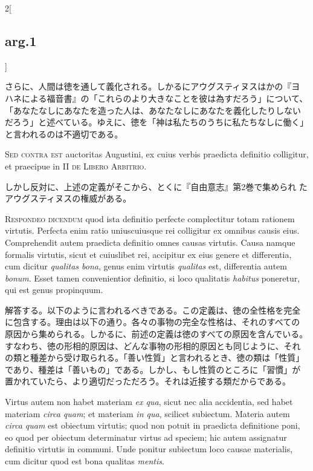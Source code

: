 \documentclass[paper=a4paper,fontsize=10pt,jafontsize=9pt,titlepage]{jlreq}
\begin{document}
\begin{paracol}{2}[\subsection{arg.1}]
\switchcolumn

さらに、人間は徳を通して義化される。しかるにアウグスティヌスはかの『ヨ
ハネによる福音書』の「これらのより大きなことを彼は為すだろう」について、
「あなたなしにあなたを造った人は、あなたなしにあなたを義化したりしない
だろう」と述べている。ゆえに、徳を「神は私たちのうちに私たちなしに働く」
と言われるのは不適切である。

\switchcolumn*[\subsection{s.c.}]

{\scshape Sed contra est} auctoritas Augustini, ex cuius verbis
praedicta definitio colligitur, et praecipue in II {\scshape de Libero
Arbitrio}.

\switchcolumn

しかし反対に、上述の定義がそこから、とくに『自由意志』第2巻で集められ
たアウグスティヌスの権威がある。


{\scshape Respondeo dicendum} quod ista definitio perfecte
complectitur totam rationem virtutis. Perfecta enim ratio
uniuscuiusque rei colligitur ex omnibus causis eius. Comprehendit
autem praedicta definitio omnes causas virtutis. Causa namque formalis
virtutis, sicut et cuiuslibet rei, accipitur ex eius genere et
differentia, cum dicitur {\itshape qualitas bona}, genus enim virtutis
{\itshape qualitas} est, differentia autem {\itshape bonum}. Esset
tamen convenientior definitio, si loco qualitatis {\itshape habitus}
poneretur, qui est genus propinquum.

\switchcolumn

解答する。以下のように言われるべきである。この定義は、徳の全性格を完全
に包含する。理由は以下の通り。各々の事物の完全な性格は、それのすべての
原因から集められる。しかるに、前述の定義は徳のすべての原因を含んでいる。
すなわち、徳の形相的原因は、どんな事物の形相的原因とも同じように、それ
の類と種差から受け取られる。「善い性質」と言われるとき、徳の類は「性質」
であり、種差は「善いもの」である。しかし、もし性質のところに「習慣」が
置かれていたら、より適切だっただろう。それは近接する類だからである。

\switchcolumn*

Virtus autem non habet materiam {\itshape ex qua}, sicut nec alia
accidentia, sed habet materiam {\itshape circa quam}; et materiam
{\itshape in qua}, scilicet subiectum. Materia autem {\itshape circa
quam} est obiectum virtutis; quod non potuit in praedicta definitione
poni, eo quod per obiectum determinatur virtus ad speciem; hic autem
assignatur definitio virtutis in communi. Unde ponitur subiectum loco
causae materialis, cum dicitur quod est bona qualitas {\itshape
mentis}.


\end{paracol}
\end{document}
